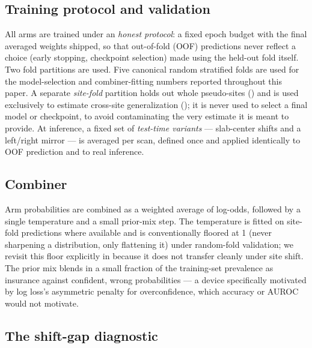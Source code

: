 \documentclass[11pt]{article}
\begin{document}
\subsection{Training protocol and validation}
\label{sec:validation}

All arms are trained under an \emph{honest protocol}: a fixed epoch budget with the final averaged weights shipped, so that out-of-fold (OOF) predictions never reflect a choice (early stopping, checkpoint selection) made using the held-out fold itself. Two fold partitions are used. Five canonical random stratified folds are used for the model-selection and combiner-fitting numbers reported throughout this paper. A separate \emph{site-fold} partition holds out whole pseudo-sites () and is used exclusively to estimate cross-site generalization (); it is never used to select a final model or checkpoint, to avoid contaminating the very estimate it is meant to provide. At inference, a fixed set of \emph{test-time variants} --- slab-center shifts and a left/right mirror --- is averaged per scan, defined once and applied identically to OOF prediction and to real inference.

\subsection{Combiner}
\label{sec:combiner}

Arm probabilities are combined as a weighted average of log-odds, followed by a single temperature and a small prior-mix step. The temperature is fitted on site-fold predictions where available and is conventionally floored at 1 (never sharpening a distribution, only flattening it) under random-fold validation; we revisit this floor explicitly in  because it does not transfer cleanly under site shift. The prior mix blends in a small fraction of the training-set prevalence as insurance against confident, wrong probabilities --- a device specifically motivated by log loss's asymmetric penalty for overconfidence, which accuracy or AUROC would not motivate.

\subsection{The shift-gap diagnostic}
\label{sec:shiftgap}
\end{document}
